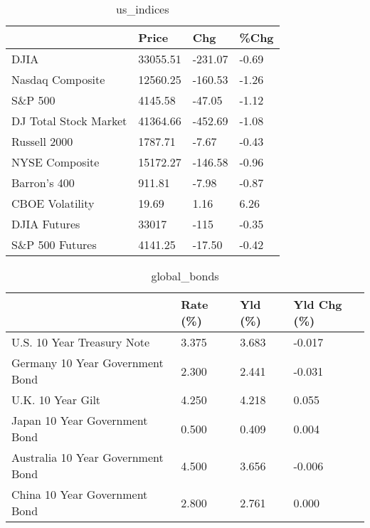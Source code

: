 \documentclass{article}%
\begin{document}
%


\begin{table}[htbp]%
\caption{us\_indices}%
\centering%
\begin{adjustbox}{width=1\textwidth}%
\begin{tabular}{llll}
\toprule
                      &    Price &     Chg &  \%Chg \\
\midrule
                 DJIA & 33055.51 & -231.07 & -0.69 \\
     Nasdaq Composite & 12560.25 & -160.53 & -1.26 \\
              S\&P 500 &  4145.58 &  -47.05 & -1.12 \\
DJ Total Stock Market & 41364.66 & -452.69 & -1.08 \\
         Russell 2000 &  1787.71 &   -7.67 & -0.43 \\
       NYSE Composite & 15172.27 & -146.58 & -0.96 \\
         Barron's 400 &   911.81 &   -7.98 & -0.87 \\
      CBOE Volatility &    19.69 &    1.16 &  6.26 \\
         DJIA Futures &    33017 &    -115 & -0.35 \\
      S\&P 500 Futures &  4141.25 &  -17.50 & -0.42 \\
\bottomrule
\end{tabular}
%
\end{adjustbox}%
\end{table}

%


\begin{table}[htbp]%
\caption{global\_bonds}%
\centering%
\begin{adjustbox}{width=1\textwidth}%
\begin{tabular}{llll}
\toprule
                                  & Rate (\%) & Yld (\%) & Yld Chg (\%) \\
\midrule
       U.S. 10 Year Treasury Note &    3.375 &   3.683 &      -0.017 \\
  Germany 10 Year Government Bond &    2.300 &   2.441 &      -0.031 \\
                U.K. 10 Year Gilt &    4.250 &   4.218 &       0.055 \\
    Japan 10 Year Government Bond &    0.500 &   0.409 &       0.004 \\
Australia 10 Year Government Bond &    4.500 &   3.656 &      -0.006 \\
    China 10 Year Government Bond &    2.800 &   2.761 &       0.000 \\
\bottomrule
\end{tabular}
%
\end{adjustbox}%
\end{table}
\end{document}
